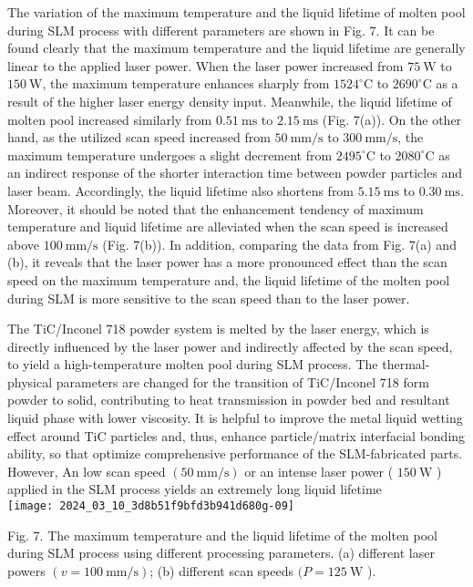 \documentclass[10pt]{article}
\begin{document}
The variation of the maximum temperature and the liquid lifetime of molten pool during SLM process with different parameters are shown in Fig. 7. It can be found clearly that the maximum temperature and the liquid lifetime are generally linear to the applied laser power. When the laser power increased from $75 \mathrm{~W}$ to $150 \mathrm{~W}$, the maximum temperature enhances sharply from $1524^{\circ} \mathrm{C}$ to $2690^{\circ} \mathrm{C}$ as a result of the higher laser energy density input. Meanwhile, the liquid lifetime of molten pool increased similarly from $0.51 \mathrm{~ms}$ to $2.15 \mathrm{~ms}$ (Fig. 7(a)). On the other hand, as the utilized scan speed increased from $50 \mathrm{~mm} / \mathrm{s}$ to $300 \mathrm{~mm} / \mathrm{s}$, the maximum temperature undergoes a slight decrement from $2495^{\circ} \mathrm{C}$ to $2080^{\circ} \mathrm{C}$ as an indirect response of the shorter interaction time between powder particles and laser beam. Accordingly, the liquid lifetime also shortens from $5.15 \mathrm{~ms}$ to $0.30 \mathrm{~ms}$. Moreover, it should be noted that the enhancement tendency of maximum temperature and liquid lifetime are alleviated when the scan speed is increased above $100 \mathrm{~mm} / \mathrm{s}$ (Fig. 7(b)). In addition, comparing the data from Fig. 7(a) and (b), it reveals that the laser power has a more pronounced effect than the scan speed on the maximum temperature and, the liquid lifetime of the molten pool during SLM is more sensitive to the scan speed than to the laser power.

The TiC/Inconel 718 powder system is melted by the laser energy, which is directly influenced by the laser power and indirectly affected by the scan speed, to yield a high-temperature molten pool during SLM process. The thermal-physical parameters are changed for the transition of TiC/Inconel 718 form powder to solid, contributing to heat transmission in powder bed and resultant liquid phase with lower viscosity. It is helpful to improve the metal liquid wetting effect around TiC particles and, thus, enhance particle/matrix interfacial bonding ability, so that optimize comprehensive performance of the SLM-fabricated parts. However, An low scan speed $(50 \mathrm{~mm} / \mathrm{s})$ or an intense laser power ( $150 \mathrm{~W}$ ) applied in the SLM process yields an extremely long liquid lifetime\\
\texttt{[image: 2024\_03\_10\_3d8b51f9bfd3b941d680g-09]}

Fig. 7. The maximum temperature and the liquid lifetime of the molten pool during SLM process using different processing parameters. (a) different laser powers $(v=100 \mathrm{~mm} / \mathrm{s})$; (b) different scan speeds $(P=125 \mathrm{~W}$ ).
\end{document}
